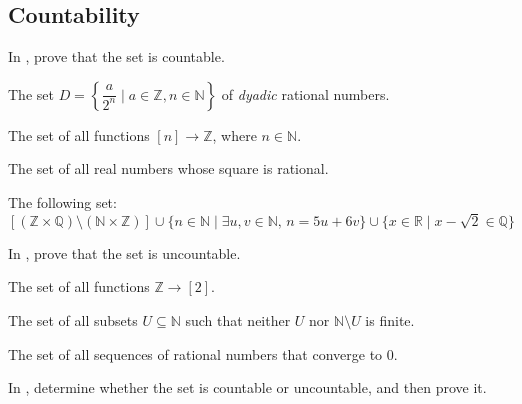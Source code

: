 \subsection*{Countability}

In , prove that the set is countable.

\begin{chapex}
\label{cqProveCountableBegin}
The set $D = \left\{ \dfrac{a}{2^n} \mid a \in \mathbb{Z}, n \in \mathbb{N} \right\}$ of \textit{dyadic} rational numbers.
\end{chapex}

\begin{chapex}
The set of all functions $[n] \to \mathbb{Z}$, where $n \in \mathbb{N}$.
\end{chapex}

\begin{chapex}
The set of all real numbers whose square is rational.
\end{chapex}

\begin{chapex}
\label{cqProveCountableEnd}
The following set:
\[
[(\mathbb{Z} \times \mathbb{Q}) \setminus (\mathbb{N} \times \mathbb{Z})] \cup \{ n \in \mathbb{N} \mid \exists u,v \in \mathbb{N},\, n=5u+6v \} \cup \{ x \in \mathbb{R} \mid x-\sqrt{2} \in \mathbb{Q} \}
\]
\end{chapex}

In , prove that the set is uncountable.

\begin{chapex}
\label{cqProveUncountableBegin}
The set of all functions $\mathbb{Z} \to [2]$.
\end{chapex}

\begin{chapex}
The set of all subsets $U \subseteq \mathbb{N}$ such that neither $U$ nor $\mathbb{N} \setminus U$ is finite.
\end{chapex}

\begin{chapex}
\label{cqProveUncountableEnd}
The set of all sequences of rational numbers that converge to $0$.
\end{chapex}

In , determine whether the set is countable or uncountable, and then prove it.

